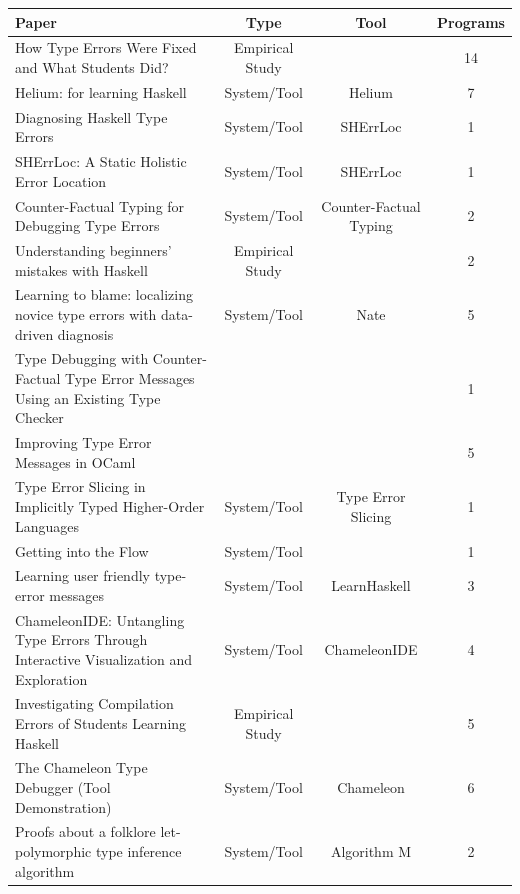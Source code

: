 \documentclass[pdflatex,sn-mathphys-num]{sn-jnl}%
\begin{document}
    \begin{table}
    \centering
    \begin{tabular}{|p{5cm}|c|c|c|} \hline 
         \textbf{Paper} & \textbf{Type} & \textbf{Tool} & \textbf{Programs} \\ \hline 
         \raggedright How Type Errors Were Fixed and What Students Did? & Empirical Study &  &  14 \\ \hline 
         \raggedright Helium: for learning Haskell & System/Tool & Helium & 7 \\ \hline 
         \raggedright Diagnosing Haskell Type Errors & System/Tool & SHErrLoc & 1 \\ \hline 
         \raggedright SHErrLoc: A Static Holistic Error Location & System/Tool & SHErrLoc & 1 \\ \hline 
         \raggedright Counter-Factual Typing for Debugging Type Errors & System/Tool & Counter-Factual Typing & 2 \\ \hline 
         \raggedright Understanding beginners' mistakes with Haskell & Empirical Study &  & 2 \\ \hline
         \raggedright Learning to blame: localizing novice type errors with data-driven diagnosis & System/Tool & Nate & 5 \\ \hline
         \raggedright Type Debugging with Counter-Factual Type Error Messages Using an Existing Type Checker &  &  & 1 \\ \hline
         \raggedright Improving Type Error Messages in OCaml &  &  & 5 \\ \hline
         \raggedright Type Error Slicing in Implicitly Typed Higher-Order Languages & System/Tool & Type Error Slicing & 1 \\ \hline
         \raggedright Getting into the Flow & System/Tool &  & 1 \\ \hline
         \raggedright Learning user friendly type-error messages & System/Tool & LearnHaskell & 3 \\ \hline
         \raggedright ChameleonIDE: Untangling Type Errors Through Interactive Visualization and Exploration & System/Tool & ChameleonIDE & 4 \\ \hline
         \raggedright Investigating Compilation Errors of Students Learning Haskell & Empirical Study &  & 5 \\ \hline
         \raggedright The Chameleon Type Debugger (Tool Demonstration) & System/Tool & Chameleon & 6 \\ \hline
         \raggedright Proofs about a folklore let-polymorphic type inference algorithm & System/Tool & Algorithm M & 2 \\ \hline

\end{tabular}
\end{table}
\end{document}
